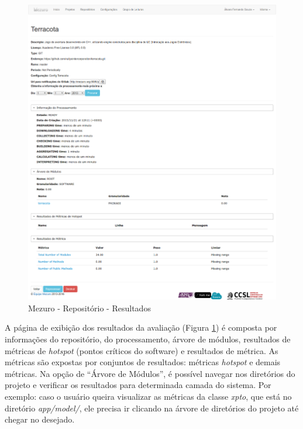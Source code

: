 \begin{figure}[!htb]
	\centering
    \includegraphics[keepaspectratio=true,scale=0.3]
    {figuras/mezuro-repositorio-view-terracota.eps}
  \caption{Mezuro - Repositório - Resultados}
	\label{fig:mezuro-repositorio-view-terracota}
\end{figure}

A página de exibição dos resultados da avaliação (Figura
\ref{fig:mezuro-repositorio-view-terracota}) é composta por informações do
repositório, do processamento, árvore de módulos, resultados de métricas de
\textit{hotspot} (pontos críticos do software) e resultados de métrica.
As métricas são expostas por conjuntos de resultados: métricas \textit{hotspot} e
demais métricas. Na opção de ``Árvore de Módulos'', é possível navegar nos
diretórios do projeto e verificar os resultados para determinada camada do
sistema. Por exemplo: caso o usuário queira visualizar as métricas da classe
\textit{xpto}, que está no diretório \textit{app/model/}, ele precisa ir
clicando na árvore de diretórios do projeto até chegar no desejado.

